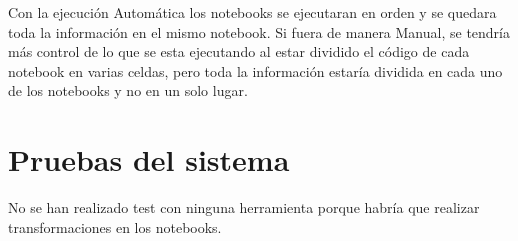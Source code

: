 Con la ejecución Automática los notebooks se ejecutaran en orden y se quedara toda la información en el mismo notebook.
Si fuera de manera Manual, se tendría más control de lo que se esta ejecutando al estar dividido el código de cada notebook en varias celdas, pero toda la información estaría dividida en cada uno de los notebooks y no en un solo lugar.



\section{Pruebas del sistema}

No se han realizado test con ninguna herramienta porque habría que realizar transformaciones en los notebooks.



